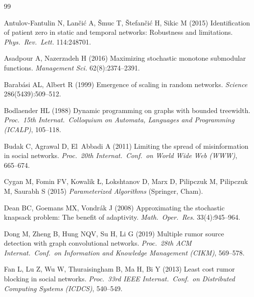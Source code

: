\documentclass[ASNA,number]{USG}
\begin{document}
\begin{thebibliography}{99}
\providecommand{\natexlab}[1]{#1}
\providecommand{\url}[1]{\texttt{#1}}
\providecommand{\urlprefix}{URL }

Antulov-Fantulin N, Lan\v{c}i\'c A, \v{S}muc T, \v{S}tefan\v{c}i\'c H,
  Sikic M (2015) Identification of patient zero in static and temporal
  networks: Robustness and limitations. \emph{Phys.\ Rev.\ Lett.}
  114:248701.

Asadpour A, Nazerzadeh H (2016) Maximizing stochastic monotone submodular
  functions. \emph{Management Sci.} 62(8):2374--2391.

Barab\'asi AL, Albert R (1999) Emergence of scaling in random networks.
  \emph{Science} 286(5439):509--512.

Bodlaender HL (1988) Dynamic programming on graphs with bounded treewidth.
  \emph{Proc.\ 15th Internat.\ Colloquium on Automata, Languages and
  Programming (ICALP)}, 105--118.

Budak C, Agrawal D, El~Abbadi A (2011) Limiting the spread of misinformation
  in social networks. \emph{Proc.\ 20th Internat.\ Conf.\ on World Wide Web
  (WWW)}, 665--674.

Cygan M, Fomin FV, Kowalik {\L}, Lokshtanov D, Marx D, Pilipczuk M,
  Pilipczuk M, Saurabh S (2015) \emph{Parameterized Algorithms} (Springer,
  Cham).

Dean BC, Goemans MX, Vondr\'ak J (2008) Approximating the stochastic
  knapsack problem: The benefit of adaptivity. \emph{Math.\ Oper.\ Res.}
  33(4):945--964.

Dong M, Zheng B, Hung NQV, Su H, Li G (2019) Multiple rumor source detection
  with graph convolutional networks. \emph{Proc.\ 28th ACM Internat.\
  Conf.\ on Information and Knowledge Management (CIKM)}, 569--578.

Fan L, Lu Z, Wu W, Thuraisingham B, Ma H, Bi Y (2013) Least cost rumor
  blocking in social networks. \emph{Proc.\ 33rd IEEE Internat.\ Conf.\ on
  Distributed Computing Systems (ICDCS)}, 540--549.


\end{thebibliography}
\end{document}
